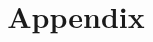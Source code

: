 \documentclass[journal,transmag]{IEEEtran}
\begin{document}
%
\title{Appendix}

\maketitle


\IEEEdisplaynontitleabstractindextext







%
\end{document}
